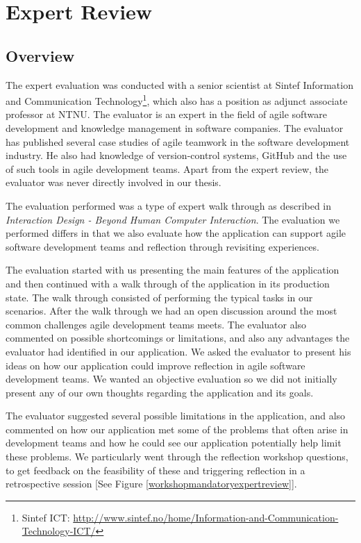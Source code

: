 \section{Expert Review}
\subsection{Overview}
The expert evaluation was conducted with a senior scientist at Sintef Information and Communication Technology\footnote{Sintef ICT: \url{http://www.sintef.no/home/Information-and-Communication-Technology-ICT/}}, which also has a position as adjunct associate professor at NTNU. The evaluator is an expert in the field of agile software development and knowledge management in software companies. The evaluator has published several case studies of agile teamwork in the software development industry. He also had knowledge of version-control systems, GitHub and the use of such tools in agile development teams. Apart from the expert review, the evaluator was never directly involved in our thesis.

The evaluation performed was a type of expert walk through as described in \emph{Interaction Design - Beyond Human Computer Interaction}\citep{rogers2011interaction}. The evaluation we performed differs in that we also evaluate how the application can support agile software development teams and reflection through revisiting experiences. 

The evaluation started with us presenting the main features of the application and then continued with a walk through of the application in its production state. The walk through consisted of performing the typical tasks in our scenarios. After the walk through we had an open discussion around the most common challenges agile development teams meets.  The evaluator also commented on possible shortcomings or limitations, and also any advantages the evaluator had identified in our application. We asked the evaluator to present his ideas on how our application could improve reflection in agile software development teams. We wanted an objective evaluation so we did not initially present any of our own thoughts regarding the application and its goals. 

The evaluator suggested several possible limitations in the application, and also commented on how our application met some of the problems that often arise in development teams and how he could see our application potentially help limit these problems. We particularly went through the reflection workshop questions, to get feedback on the feasibility of these and triggering reflection in a retrospective session [See Figure \ref{workshopmandatoryexpertreview}]. 

